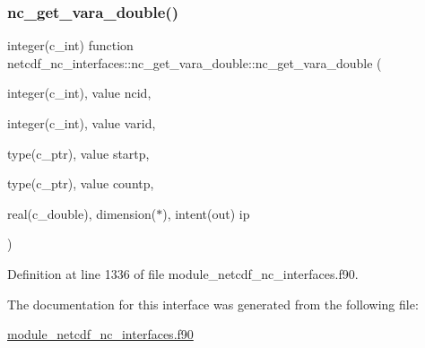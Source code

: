 \subsubsection{\texorpdfstring{nc\+\_\+get\+\_\+vara\+\_\+double()}{nc\_get\_vara\_double()}}
{\footnotesize\ttfamily integer(c\+\_\+int) function netcdf\+\_\+nc\+\_\+interfaces\+::nc\+\_\+get\+\_\+vara\+\_\+double\+::nc\+\_\+get\+\_\+vara\+\_\+double (\begin{DoxyParamCaption}\item[{integer(c\+\_\+int), value}]{ncid,  }\item[{integer(c\+\_\+int), value}]{varid,  }\item[{type(c\+\_\+ptr), value}]{startp,  }\item[{type(c\+\_\+ptr), value}]{countp,  }\item[{real(c\+\_\+double), dimension($\ast$), intent(out)}]{ip }\end{DoxyParamCaption})}



Definition at line 1336 of file module\+\_\+netcdf\+\_\+nc\+\_\+interfaces.\+f90.



The documentation for this interface was generated from the following file\+:\begin{DoxyCompactItemize}
\item 
\hyperlink{module__netcdf__nc__interfaces_8f90}{module\+\_\+netcdf\+\_\+nc\+\_\+interfaces.\+f90}\end{DoxyCompactItemize}
